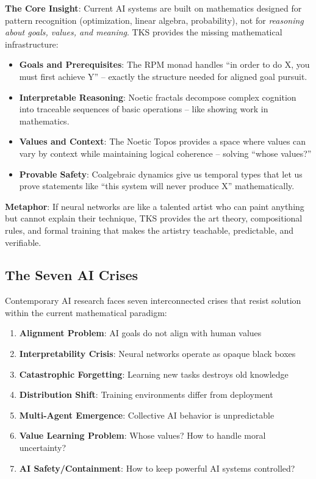 \documentclass[11pt,twoside]{article}
\theoremstyle{definition}
\theoremstyle{plain}
\theoremstyle{remark}
\begin{document}
\begin{tcolorbox}[colback=green!5!white,colframe=green!60!black,title=\textbf{Plain English: Why TKS for AI?}]
\textbf{The Core Insight}: Current AI systems are built on mathematics designed for
pattern recognition (optimization, linear algebra, probability), not for \emph{reasoning
about goals, values, and meaning}. TKS provides the missing mathematical infrastructure:

\begin{itemize}
  \item \textbf{Goals and Prerequisites}: The RPM monad handles ``in order to do X, you
        must first achieve Y'' -- exactly the structure needed for aligned goal pursuit.
  \item \textbf{Interpretable Reasoning}: Noetic fractals decompose complex cognition into
        traceable sequences of basic operations -- like showing work in mathematics.
  \item \textbf{Values and Context}: The Noetic Topos provides a space where values can
        vary by context while maintaining logical coherence -- solving ``whose values?''
  \item \textbf{Provable Safety}: Coalgebraic dynamics give us temporal types that let us
        prove statements like ``this system will never produce X'' mathematically.
\end{itemize}

\textbf{Metaphor}: If neural networks are like a talented artist who can paint anything
but cannot explain their technique, TKS provides the art theory, compositional rules,
and formal training that makes the artistry teachable, predictable, and verifiable.
\end{tcolorbox}

\subsection{The Seven AI Crises}

Contemporary AI research faces seven interconnected crises that resist solution within
the current mathematical paradigm:

\begin{enumerate}
  \item \textbf{Alignment Problem}: AI goals do not align with human values
  \item \textbf{Interpretability Crisis}: Neural networks operate as opaque black boxes
  \item \textbf{Catastrophic Forgetting}: Learning new tasks destroys old knowledge
  \item \textbf{Distribution Shift}: Training environments differ from deployment
  \item \textbf{Multi-Agent Emergence}: Collective AI behavior is unpredictable
  \item \textbf{Value Learning Problem}: Whose values? How to handle moral uncertainty?
  \item \textbf{AI Safety/Containment}: How to keep powerful AI systems controlled?
\end{enumerate}
\end{document}
